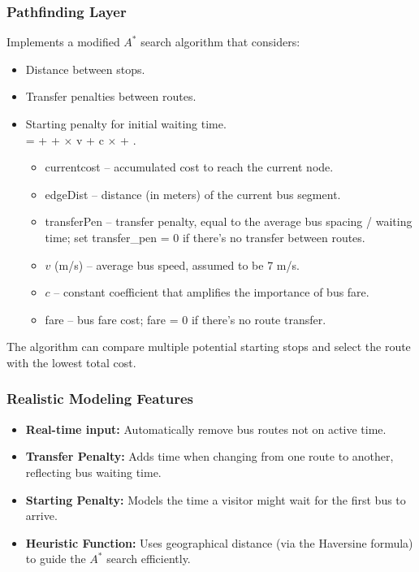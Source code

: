 \subsubsection{Pathfinding Layer}
Implements a modified $A^*$ search algorithm that considers:
\begin{itemize}
  \item Distance between stops.
  \item Transfer penalties between routes.
  \item Starting penalty for initial waiting time. \\
     =  +  + $\times$ v + c $\times$  + .

    \begin{itemize}
        \item currentcost -- accumulated cost to reach the current node.
        \item edgeDist -- distance (in meters) of the current bus segment.
        \item transferPen -- transfer penalty, equal to the average bus spacing / waiting time; set transfer\_pen = 0 if there’s no transfer between routes.
        \item $v$ (m/s) -- average bus speed, assumed to be 7 m/s.
        \item $c$ -- constant coefficient that amplifies the importance of bus fare.
        \item fare -- bus fare cost; fare = 0 if there’s no route transfer.
    \end{itemize}
\end{itemize}
The algorithm can compare multiple potential starting stops and select the route with the lowest total cost.

\subsubsection{Realistic Modeling Features}
\begin{itemize}
  \item \textbf{Real-time input:} Automatically remove bus routes not on active time.
  \item \textbf{Transfer Penalty:} Adds time when changing from one route to another, reflecting bus waiting time.
  \item \textbf{Starting Penalty:} Models the time a visitor might wait for the first bus to arrive.
  \item \textbf{Heuristic Function:} Uses geographical distance (via the Haversine formula) to guide the $A^*$ search efficiently.
\end{itemize}

